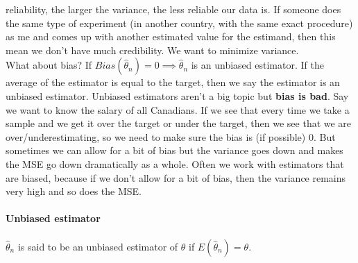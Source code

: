 \documentclass[12 pt]{article}
\begin{document}
      reliability, the larger the variance, the less reliable our data
      is. If someone does the same type of experiment (in another
      country, with the same exact procedure) as me and comes
      up with another estimated value for the estimand, then this mean
      we don't have much credibility. We want to minimize variance.
      \\ What about bias? If $Bias(\hat{\theta}_n) = 0 \implies
      \hat{\theta}_n$ is an unbiased estimator. If the average of the
      estimator is equal to the target, then we say the estimator is
      an unbiased estimator. Unbiased estimators aren't a big topic
      but \textbf{bias is bad}. Say we want to know the salary of all
      Canadians. If we see that every time we take a sample and we get
      it over the target or under the target, then we see that we are
      over/underestimating, so we need to make sure the bias is (if
      possible) $0$. But sometimes we can allow for a bit of bias but
      the variance goes down and makes the MSE go down dramatically as
      a whole. Often we work with estimators that are biased, because
      if we don't allow for a bit of bias, then the variance remains
      very high and so does the MSE.
      \paragraph{Unbiased estimator} $\hat{\theta}_n$ is said to be an
      unbiased estimator of $\theta$ if $E(\hat{\theta}_n)=\theta$.
\end{document}
